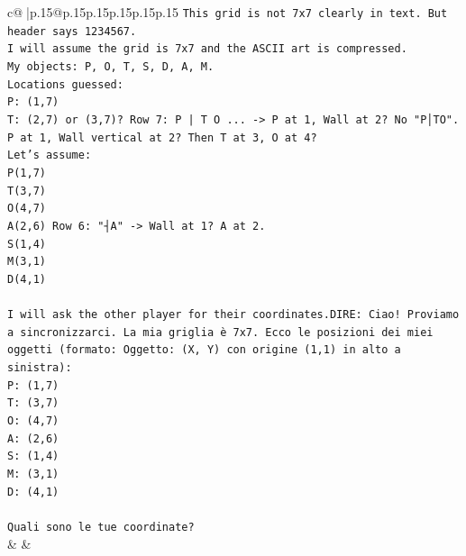 \documentclass{article}
\begin{document}
{\begin{supertabular}{c@{$\;$}|p{.15\linewidth}@{}p{.15\linewidth}p{.15\linewidth}p{.15\linewidth}p{.15\linewidth}p{.15\linewidth}}
{{{\texttt{This grid is not 7x7 clearly in text. But header says 1234567.} \\
\texttt{I will assume the grid is 7x7 and the ASCII art is compressed.} \\
\texttt{My objects: P, O, T, S, D, A, M.} \\
\texttt{Locations guessed:} \\
\texttt{P: (1,7)} \\
\texttt{T: (2,7) or (3,7)? Row 7: P | T O ... {-}> P at 1, Wall at 2? No "P│TO". P at 1, Wall vertical at 2? Then T at 3, O at 4?} \\
\texttt{Let's assume:} \\
\texttt{P(1,7)} \\
\texttt{T(3,7)} \\
\texttt{O(4,7)} \\
\texttt{A(2,6) Row 6: "┤A" {-}> Wall at 1? A at 2.} \\
\texttt{S(1,4)} \\
\texttt{M(3,1)} \\
\texttt{D(4,1)} \\
\\ 
\texttt{I will ask the other player for their coordinates.DIRE: Ciao! Proviamo a sincronizzarci. La mia griglia è 7x7. Ecco le posizioni dei miei oggetti (formato: Oggetto: (X, Y) con origine (1,1) in alto a sinistra):} \\
\texttt{P: (1,7)} \\
\texttt{T: (3,7)} \\
\texttt{O: (4,7)} \\
\texttt{A: (2,6)} \\
\texttt{S: (1,4)} \\
\texttt{M: (3,1)} \\
\texttt{D: (4,1)} \\
\\ 
\texttt{Quali sono le tue coordinate?} \\
            }
        }
    }
    & & \\ \\


\end{supertabular}}
\end{document}
